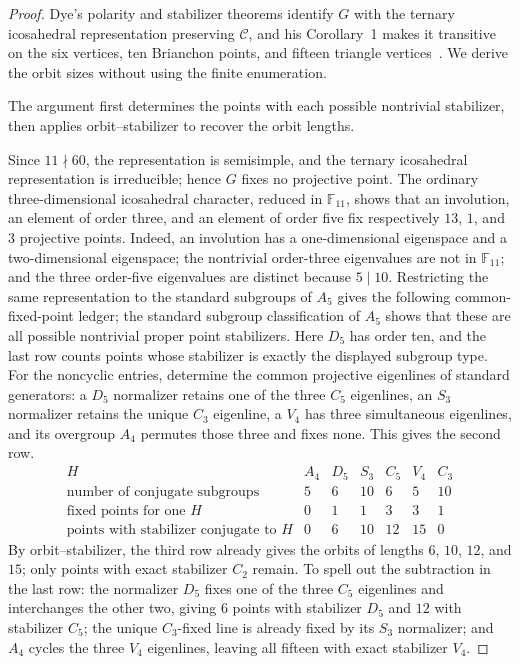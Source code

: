 \documentclass[11pt]{article}
\theoremstyle{definition}
\theoremstyle{remark}
\newcommand{\F}{\mathbb{F}}
\newcommand{\cC}{\mathcal{C}}
\begin{document}
\begin{proof}
Dye's polarity and stabilizer theorems identify $G$ with the ternary
icosahedral representation preserving $\cC$, and his Corollary~1 makes it
transitive on the six vertices, ten Brianchon points, and fifteen triangle
vertices~\cite[Theorems~2--3 and Corollary~1, pp.~276--279]{Dye1991}.
We derive the orbit sizes without using the finite enumeration.

The argument first determines the points with each possible nontrivial
stabilizer, then applies orbit--stabilizer to recover the orbit lengths.

Since $11\nmid60$, the representation is semisimple, and the ternary
icosahedral representation is irreducible; hence $G$ fixes no projective
point. The ordinary
three-dimensional icosahedral character, reduced in $\F_{11}$, shows that
an involution, an element of order three, and an element of order five fix
respectively $13$, $1$, and $3$ projective points. Indeed, an involution
has a one-dimensional eigenspace and a two-dimensional eigenspace; the
nontrivial order-three eigenvalues are not in $\F_{11}$; and the three
order-five eigenvalues are distinct because $5\mid10$. Restricting the same
representation to the standard subgroups of $A_5$ gives the following
common-fixed-point ledger; the standard subgroup classification of $A_5$
shows that these are all possible nontrivial proper point stabilizers. Here
$D_5$ has order ten, and the last row counts points whose stabilizer is
exactly the displayed subgroup type.
For the noncyclic entries, determine the common projective eigenlines of
standard generators: a $D_5$ normalizer retains one of the three $C_5$
eigenlines, an $S_3$ normalizer retains the unique $C_3$ eigenline, a $V_4$
has three
simultaneous eigenlines, and its overgroup $A_4$ permutes those three and
fixes none. This gives the second row.
\[
\begin{array}{c|rrrrrr}
H&A_4&D_5&S_3&C_5&V_4&C_3\\ \hline
\text{number of conjugate subgroups}&5&6&10&6&5&10\\
\text{fixed points for one }H&0&1&1&3&3&1\\
\text{points with stabilizer conjugate to }H&0&6&10&12&15&0
\end{array}
\]
By orbit--stabilizer, the third row already gives the orbits of lengths
$6$, $10$, $12$, and $15$; only points with exact stabilizer $C_2$ remain.
To spell out the subtraction in the last row: the normalizer $D_5$ fixes
one of the three $C_5$ eigenlines and interchanges the other two, giving
$6$ points with stabilizer $D_5$ and $12$ with stabilizer $C_5$; the unique
$C_3$-fixed line is already fixed by its $S_3$ normalizer; and $A_4$ cycles
the three $V_4$ eigenlines, leaving all fifteen with exact stabilizer $V_4$.


\end{proof}
\end{document}
